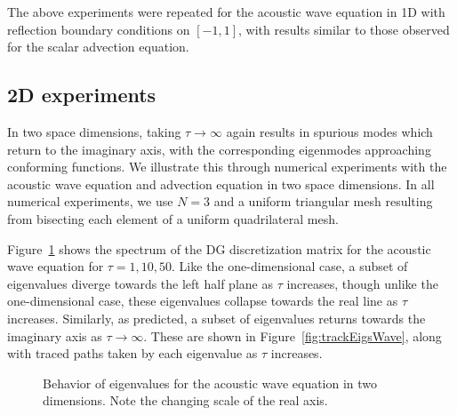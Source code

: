 \documentclass[preprint,10pt]{elsarticle}
\newcommand{\note}[1]{{\color{blue}#1}}
\begin{document}
The above experiments were repeated for the acoustic wave equation in 1D with reflection boundary conditions on $[-1,1]$, with results similar to those observed for the scalar advection equation.   %


\subsection{2D experiments}

In two space dimensions, taking $\tau\rightarrow \infty$ again results in spurious modes which return to the imaginary axis, with the corresponding eigenmodes approaching conforming functions.  We illustrate this through numerical experiments with the acoustic wave equation and advection equation in two space dimensions.  In all numerical experiments, we use $N=3$ and a uniform triangular mesh resulting from bisecting each element of a uniform quadrilateral mesh.  

Figure~\ref{fig:waveeigs} shows the \note{spectrum} of the DG discretization matrix for the acoustic wave equation for $\tau = 1, 10, 50$.  Like the one-dimensional case, a subset of eigenvalues diverge towards the left half plane as $\tau$ increases, though unlike the one-dimensional case, these eigenvalues collapse towards the real line as $\tau$ increases.  Similarly, as predicted, a subset of eigenvalues returns towards the imaginary axis as $\tau \rightarrow \infty$.  These are shown in Figure~\ref{fig:trackEigsWave}, along with traced paths taken by each eigenvalue as $\tau$ increases.  

\begin{figure}
\centering
{}
\hspace{.5em}
\hspace{.5em}
\caption{Behavior of eigenvalues for the acoustic wave equation in two dimensions. Note the changing scale of the real axis.}
\label{fig:waveeigs}
\end{figure}
\end{document}
